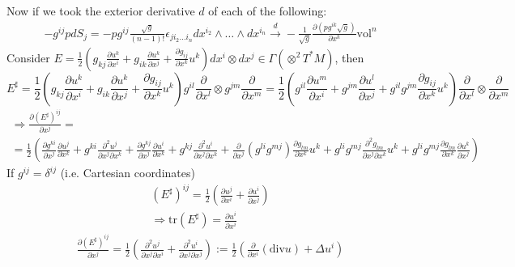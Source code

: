 \documentclass[twoside,landscape,10pt]{amsart}
\theoremstyle{plain}
\theoremstyle{definition}
\theoremstyle{remark}
\theoremstyle{remark}
\begin{document}
\begin{multicols*}{2}
Now if we took the exterior derivative $d$ of each of the following:
\[
\begin{gathered}
  -g^{ij} p dS_j = -p g^{ij} \frac{\sqrt{g}}{(n-1)!} \epsilon_{ji_2 \dots i_n} dx^{i_2} \wedge \dots \wedge dx^{i_n} \xrightarrow{ d } -\frac{1}{\sqrt{g}}\frac{ \partial (p g^{ik} \sqrt{g})}{ \partial x^k} \text{vol}^n
\end{gathered}
\]
Consider $E = \frac{1}{2} \left( g_{kj} \frac{ \partial u^k}{ \partial x^i} + g_{ik} \frac{ \partial u^k}{ \partial x^j} + \frac{ \partial g_{ij}}{ \partial x^k} u^k \right)dx^i \otimes dx^j \in \Gamma(\otimes^2 T^*M )$, then
\[
E^{\sharp} =  \frac{1}{2} \left( g_{kj} \frac{ \partial u^k}{ \partial x^i} + g_{ik} \frac{ \partial u^k}{ \partial x^j} + \frac{ \partial g_{ij}}{ \partial x^k} u^k \right) g^{il} \frac{ \partial }{ \partial x^l} \otimes g^{jm} \frac{ \partial }{ \partial x^m} = \frac{1}{2} \left( g^{il} \frac{ \partial u^m}{ \partial x^i} + g^{jm} \frac{ \partial u^l }{ \partial x^j} + g^{il} g^{jm} \frac{ \partial g_{ij} }{ \partial x^k} u^k \right) \frac{\partial}{ \partial x^l} \otimes \frac{\partial }{ \partial x^m}
\]
\[
\begin{gathered}
  \Longrightarrow \frac{ \partial (E^{\sharp})^{ij} }{ \partial x^j} = \\
  = \frac{1}{2} \left( \frac{ \partial g^{ki} }{ \partial x^j} \frac{ \partial u^j}{ \partial x^k} + g^{ki} \frac{ \partial^2 u^j }{ \partial x^j \partial x^k } + \frac{ \partial g^{kj} }{ \partial x^j} \frac{ \partial u^i }{ \partial x^k} + g^{kj} \frac{ \partial^2 u^i }{ \partial x^j \partial x^k} + \frac{ \partial }{ \partial x^j } (g^{li} g^{mj} ) \frac{ \partial g_{lm}}{ \partial x^k} u^k + g^{li} g^{mj} \frac{ \partial^2 g_{lm}}{ \partial x^j \partial x^k} u^k + g^{li} g^{mj} \frac{\partial g_{lm}}{ \partial x^k} \frac{\partial u^k}{ \partial x^j} \right)
\end{gathered}
\]
If $g^{ij} = \delta^{ij}$ (i.e. Cartesian coordinates)
\[
\begin{gathered}
  (E^{\sharp})^{ij} = \frac{1}{2} \left( \frac{ \partial u^j}{ \partial x^i} + \frac{ \partial u^i }{ \partial x^j} \right) \\ 
  \Longrightarrow \text{tr}(E^{\sharp}) = \frac{ \partial u^i}{ \partial x^i}
\end{gathered}
\]
\[
\begin{gathered}
  \frac{ \partial (E^{\sharp})^{ij}}{ \partial x^j} = \frac{1}{2} \left( \frac{ \partial^2 u^j}{ \partial x^j \partial x^i} + \frac{ \partial^2 u^i }{ \partial x^j  \partial x^j } \right) := \frac{1}{2} \left( \frac{ \partial }{ \partial x^i} (\text{div}u) + \Delta u^i \right)

\end{gathered}\]
\end{multicols*}
\end{document}
